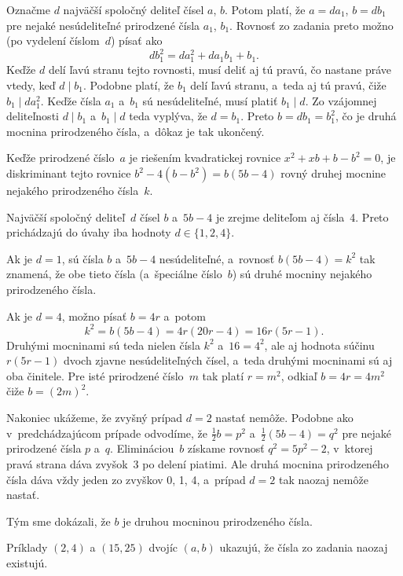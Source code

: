 {%
Označme $d$ najväčší spoločný deliteľ čísel $a$, $b$. Potom platí, že $a =
da_1$, $b= db_1$ pre nejaké nesúdeliteľné prirodzené čísla $a_1$, $b_1$.
Rovnosť zo zadania preto možno (po vydelení číslom~$d$) písať ako
$$
db_1^2 = da_1^2 + da_1b_1 + b_1.
$$
Keďže $d$ delí ľavú stranu tejto rovnosti, musí deliť
aj tú pravú, čo nastane práve vtedy, keď $d \mid b_1$. Podobne platí, že
$b_1$ delí ľavú stranu, a~teda aj tú pravú, čiže
$b_1 \mid da_1^2$. Keďže čísla $a_1$ a~$b_1$ sú nesúdeliteľné,
musí platiť $b_1 \mid d$. Zo vzájomnej deliteľnosti $d \mid b_1$ a~$b_1
\mid d$ teda vyplýva, že $d = b_1$. Preto $b = db_1 = b_1^2$, čo
je druhá mocnina prirodzeného čísla, a~dôkaz je tak ukončený.

\ineres
Keďže prirodzené číslo~$a$ je riešením kvadratickej rovnice
$x^2 + xb + {b-b^2}=0$, je diskriminant tejto rovnice $b^2 - 4(b-b^2) = b(5b-4)$
rovný druhej mocnine nejakého prirodzeného čísla~$k$.

Najväčší spoločný deliteľ~$d$ čísel $b$ a~$5b-4$ je zrejme deliteľom
aj čísla~4. Preto prichádzajú do úvahy iba hodnoty $d \in \{1, 2, 4\}$.

Ak je $d=1$, sú čísla $b$ a~$5b-4$ nesúdeliteľné, a~rovnosť $b(5b-4) =k^2$
tak znamená, že obe tieto čísla (a~špeciálne číslo~$b$) sú druhé mocniny
nejakého prirodzeného čísla.

Ak je $d = 4$, možno písať $b=4r$ a~potom
$$
k^2 = b(5b-4)=4r(20r-4)=16r(5r-1).
$$
Druhými mocninami sú teda nielen čísla $k^2$ a~$16=4^2$, ale aj hodnota
súčinu $r(5r-1)$ dvoch zjavne nesúdeliteľných čísel, a~teda druhými mocninami
sú aj oba činitele. Pre isté prirodzené číslo~$m$ tak platí $r=m^2$,
odkiaľ $b=4r=4m^2$ čiže $b=(2m)^2$.

Nakoniec ukážeme, že zvyšný prípad $d=2$ nastať nemôže. Podobne
ako v~predchádzajúcom prípade odvodíme, že $\frac1{2}{b} = p^2$
a~$\frac1{2}(5b-4) = q^2$ pre nejaké prirodzené čísla $p$ a~$q$.
Elimináciou~$b$ získame rovnosť $q^2 = 5p^2-2$, v~ktorej pravá strana dáva
zvyšok~3 po delení piatimi. Ale druhá mocnina prirodzeného čísla dáva
vždy jeden zo zvyškov 0, 1, 4, a~prípad $d=2$ tak naozaj nemôže
nastať.

Tým sme dokázali, že $b$ je druhou mocninou prirodzeného čísla.

\poznamka
Príklady $(2, 4)$ a $(15, 25)$ dvojíc $(a,b)$ ukazujú, že čísla
zo zadania naozaj existujú.
}

